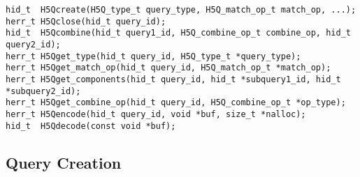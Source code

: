 {
\begin{lstlisting}
hid_t  H5Qcreate(H5Q_type_t query_type, H5Q_match_op_t match_op, ...);
herr_t H5Qclose(hid_t query_id);
hid_t  H5Qcombine(hid_t query1_id, H5Q_combine_op_t combine_op, hid_t query2_id);
herr_t H5Qget_type(hid_t query_id, H5Q_type_t *query_type);
herr_t H5Qget_match_op(hid_t query_id, H5Q_match_op_t *match_op);
herr_t H5Qget_components(hid_t query_id, hid_t *subquery1_id, hid_t *subquery2_id);
herr_t H5Qget_combine_op(hid_t query_id, H5Q_combine_op_t *op_type);
herr_t H5Qencode(hid_t query_id, void *buf, size_t *nalloc);
hid_t  H5Qdecode(const void *buf);
\end{lstlisting}
}

\subsection{Query Creation}

